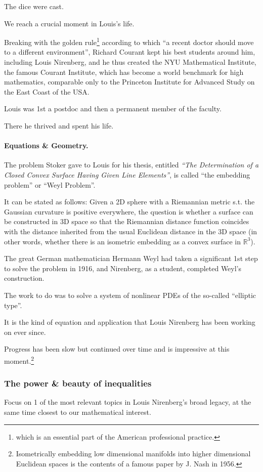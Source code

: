 \documentclass{article}
\begin{document}
The dice were cast.

We reach a crucial moment in Louis's life.

Breaking with the golden rule\footnote{which is an essential part of the American professional practice.} according to which ``a recent doctor should move to a different environment'', Richard Courant kept his best students around him, including Louis Nirenberg, and he thus created the NYU Mathematical Institute, the famous Courant Institute, which has become a world benchmark for high mathematics, comparable only to the Princeton Institute for Advanced Study on the East Coast of the USA.

Louis was 1st a postdoc and then a permanent member of the faculty.

There he thrived and spent his life.

\paragraph{Equations \& Geometry.} The problem Stoker gave to Louis for his thesis, entitled \textit{``The Determination of a Closed Convex Surface Having Given Line Elements''}, is called ``the embedding problem'' or ``Weyl Problem''.

It can be stated as follows: Given a 2D sphere with a Riemannian metric s.t. the Gaussian curvature is positive everywhere, the question is whether a surface can be constructed in 3D space so that the Riemannian distance function coincides with the distance inherited from the usual Euclidean distance in the 3D space (in other words, whether there is an isometric embedding as a convex surface in $\mathbb{R}^3$).

The great German mathematician Hermann Weyl had taken a significant 1st step to solve the problem in 1916, and Nirenberg, as a student, completed Weyl's construction.

The work to do was to solve a system of nonlinear PDEs of the so-called ``elliptic type''.

It is the kind of equation and application that Louis Nirenberg has been working on ever since.

Progress has been slow but continued over time and is impressive at this moment.\footnote{Isometrically embedding low dimensional manifolds into higher dimensional Euclidean spaces is the contents of a famous paper by J. Nash in 1956.}

\subsubsection{The power \& beauty of inequalities}
Focus on 1 of the most relevant topics in Louis Nirenberg's broad legacy, at the same time closest to our mathematical interest.
\end{document}
